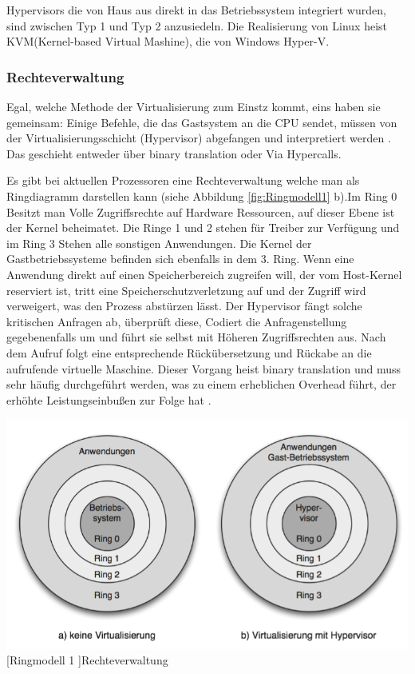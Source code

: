 

Hypervisors die von Haus aus direkt in das Betriebssystem integriert wurden, sind zwischen Typ 1 und Typ 2 anzusiedeln. Die Realisierung von Linux heist KVM(Kernel-based Virtual Mashine), die von Windows Hyper-V.

\subsubsection{Rechteverwaltung}
Egal, welche Methode der Virtualisierung zum Einstz kommt, eins haben sie gemeinsam: Einige Befehle, die das Gastsystem an die CPU sendet, müssen von der Virtualisierungsschicht (Hypervisor) abgefangen und interpretiert werden \cite{Meinel2011VirtualisierungMarktubersicht}. Das geschieht entweder über \glqq binary translation \grqq{} oder Via Hypercalls. 

 Es gibt bei aktuellen Prozessoren eine Rechteverwaltung welche man als Ringdiagramm darstellen kann (siehe Abbildung \ref{fig:Ringmodell1} b).Im Ring 0 Besitzt man Volle Zugriffsrechte auf Hardware Ressourcen, auf dieser Ebene ist der Kernel beheimatet. Die Ringe 1 und 2 stehen für Treiber zur Verfügung und im Ring 3 Stehen alle sonstigen Anwendungen. Die Kernel der Gastbetriebssysteme befinden sich ebenfalls in dem 3. Ring. Wenn eine Anwendung direkt auf einen Speicherbereich zugreifen will, der vom Host-Kernel reserviert ist, tritt eine Speicherschutzverletzung auf und der Zugriff wird verweigert, was den Prozess abstürzen lässt. Der Hypervisor fängt solche kritischen Anfragen ab, überprüft diese, Codiert die Anfragenstellung gegebenenfalls um und führt sie selbst mit Höheren Zugriffsrechten aus. Nach dem Aufruf folgt eine entsprechende Rückübersetzung und Rückabe an die aufrufende virtuelle Maschine. Dieser Vorgang heist \glqq binary translation \grqq{} und muss sehr häufig durchgeführt werden, was zu einem erheblichen Overhead führt, der erhöhte Leistungseinbußen zur Folge hat \cite{Meinel2011VirtualisierungMarktubersicht}. 
 
 
 \vspace{1em}
\begin{minipage}{\linewidth}
	\centering
	\includegraphics[width=1\linewidth]{pics/Ringmodell1.PNG}
	[Ringmodell 1 ]{Rechteverwaltung \cite{Meinel2011VirtualisierungMarktubersicht} }
	\label{fig:Ringmodell1}
\end{minipage}
 
